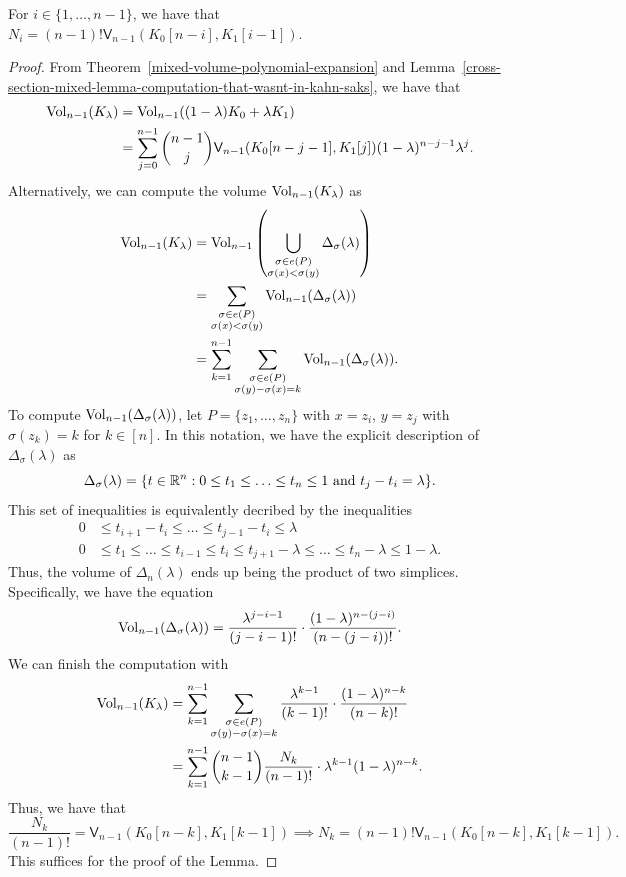 \documentclass{puthesis-UG}
\begin{document}
\begin{lem} \label{computation-of-mixed-volume-in-kahn-saks-case}
	For $i \in \{1, \ldots, n-1\}$, we have that $N_i = (n-1)! \mathsf{V}_{n-1}(K_0[n-i], K_1[i-1])$. 
\end{lem}
\begin{proof}
	From Theorem~\ref{mixed-volume-polynomial-expansion} and Lemma~\ref{cross-section-mixed-lemma-computation-that-wasnt-in-kahn-saks}, we have that 
	\begin{align*}
		\operatorname{Vol}_{n-1}(K_\lambda) & = \operatorname{Vol}_{n-1}  ( (1-\lambda) K_0 + \lambda K_1 ) \\
		& = \sum_{j = 0}^{n-1} \binom{n-1}{j} \mathsf{V}_{n-1}(K_0[n-j-1], K_1[j]) (1-\lambda)^{n-j-1} \lambda^j.
	\end{align*}
	Alternatively, we can compute the volume $\operatorname{Vol}_{n-1}(K_\lambda)$ as 
	\begin{align*}
		\operatorname{Vol}_{n-1} (K_\lambda) & = \operatorname{Vol}_{n-1} \left ( \bigcup_{\substack{\sigma \in e(P) \\ \sigma(x) < \sigma(y)}} \Delta_\sigma (\lambda) \right ) \\
		& = \sum_{\substack{\sigma \in e(P) \\ \sigma(x) < \sigma(y)}} \operatorname{Vol}_{n-1}(\Delta_\sigma (\lambda)) \\
		& = \sum_{k = 1}^{n-1} \sum_{\substack{\sigma \in e(P) \\ \sigma(y) - \sigma(x) = k}} \operatorname{Vol}_{n-1}(\Delta_\sigma(\lambda)).
	\end{align*}
	To compute $\operatorname{Vol}_{n-1}(\Delta_\sigma (\lambda))$, let $P = \{z_1, \ldots, z_n\}$ with $x = z_i$, $y = z_j$ with $\sigma(z_k) = k$ for $k \in [n]$. In this notation, we have the explicit description of $\Delta_\sigma (\lambda)$ as 
	\[
		\Delta_\sigma (\lambda) = \{t \in \mathbb{R}^n : 0 \leq t_1 \leq \ldots \leq t_n \leq 1 \text{ and } t_j - t_i = \lambda \}.
	\]
	This set of inequalities is equivalently decribed by the inequalities
	\begin{align*}
		0 & \leq t_{i+1} - t_i \leq \ldots \leq t_{j-1} - t_i \leq \lambda \\
		0 & \leq t_1 \leq \ldots \leq t_{i-1} \leq t_i \leq t_{j+1} - \lambda \leq \ldots \leq t_n - \lambda \leq 1 - \lambda.
	\end{align*}
	Thus, the volume of $\Delta_n (\lambda)$ ends up being the product of two simplices. Specifically, we have the equation 
	\[
		\operatorname{Vol}_{n-1}(\Delta_\sigma(\lambda)) = \frac{\lambda^{j-i-1}}{(j-i-1)!} \cdot \frac{(1-\lambda)^{n-(j-i)}}{(n-(j-i))!}. 
	\]
	We can finish the computation with 
	\begin{align*}
		\operatorname{Vol}_{n-1}(K_\lambda) & = \sum_{k = 1}^{n-1} \sum_{\substack{\sigma \in e(P) \\ \sigma(y) - \sigma(x) = k}} \frac{\lambda^{k-1}}{(k-1)!} \cdot \frac{(1-\lambda)^{n-k}}{(n-k)!} \\
		& = \sum_{k = 1}^{n-1} \binom{n-1}{k-1} \frac{N_k}{(n-1)!} \cdot \lambda^{k-1}(1-\lambda)^{n-k}.
	\end{align*}
	Thus, we have that 
	\[
		\frac{N_k}{(n-1)!} = \mathsf{V}_{n-1}(K_0[n-k], K_1[k-1]) \implies N_k = (n-1)! \mathsf{V}_{n-1}(K_0[n-k], K_1[k-1]).
	\]
	This suffices for the proof of the Lemma. 
\end{proof}
\end{document}
